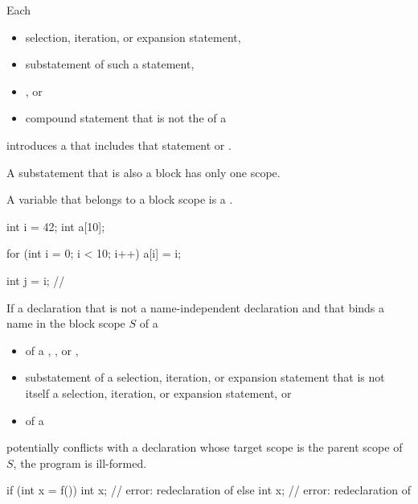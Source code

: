 %

\pnum
Each
\begin{itemize}
\item
selection, iteration, or expansion statement,
\item
substatement of such a statement,
\item
{}%
, or
\item
compound statement
that is not the  of a 
\end{itemize}
introduces a 
that includes that statement or .
\begin{note}
A substatement that is also a block has only one scope.
\end{note}
A variable that belongs to a block scope is a .
\begin{example}
\begin{codeblock}
int i = 42;
int a[10];

for (int i = 0; i < 10; i++)
  a[i] = i;

int j = i;          // 
\end{codeblock}
\end{example}

\pnum
If a declaration
that is not a name-independent declaration and
that binds a name in the block scope $S$ of a
\begin{itemize}
\item
{} of a ,
, or ,
\item
substatement of a selection, iteration, or expansion statement
that is not itself a selection, iteration, or expansion statement, or
\item
{} of a 
\end{itemize}
potentially conflicts with a declaration
whose target scope is the parent scope of $S$,
the program is ill-formed.
\begin{example}
\begin{codeblock}
if (int x = f()) {
  int x;            // error: redeclaration of 
}
else {
  int x;            // error: redeclaration of 
}
\end{codeblock}
\end{example}

